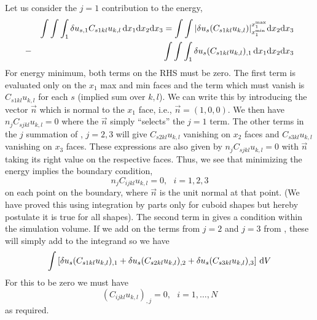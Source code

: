 \documentclass[a4paper]{article}
\begin{document}
Let us consider the $j=1$ contribution to the
energy,
\begin{eqnarray}
 &{}& \int \int \int_1 \delta u_{s,1} C_{s1kl} u_{k,l}\, \mathrm{d} x_1 \mathrm{d} x_2 \mathrm{d} x_3
=\int \int |\delta u_s (C_{s1kl} u_{k,l})|_{x_1^{\mathrm{min}}}^{x_1^{\mathrm{max}}}\mathrm{d} x_2 \mathrm{d} x_3 
\nonumber\\
&-&\int\int\int_1 \delta u_s (C_{s1kl} u_{k,l})_{,1} \,\mathrm{d} x_1 \mathrm{d} x_2 \mathrm{d} x_3
\label{byparts}
\end{eqnarray}
For energy minimum, both terms on the RHS must be zero. The first term
is evaluated only on the $x_1$ max and min faces and the term which
must vanish is $C_{s1kl} u_{k,l}$ for each $s$ (implied sum over
$k,l$). We can write this by introducing the vector $\vec n$ which is
normal to the $x_1$ face, i.e., $\vec n=(1,0,0)$. We then have
$n_j C_{sjkl} u_{k,l}=0$ where the $\vec n$ simply ``selects'' the
$j=1$ term. The other terms in the $j$ summation of , $j=2,3$ will
give $C_{s2kl} u_{k,l}$ vanishing on $x_2$ faces and $C_{s3kl}
u_{k,l}$ vanishing on $x_3$ faces. These expressions are also given by
$n_j C_{sjkl} u_{k,l}=0$ with $\vec n$ taking its right value on the
respective faces. Thus, we see that minimizing the energy implies the
boundary condition,
\begin{equation}
  n_j C_{ijkl} u_{k,l}=0,~~~i=1,2,3
\end{equation}
on each point on the boundary, where $\vec n$ is the unit normal at
that point. (We have proved this using integration by parts only for
cuboid shapes but hereby postulate it is true for all shapes). The second
term in  gives a condition within the simulation volume. If we add
on the terms from $j=2$ and $j=3$ from , these will simply add to the
integrand so we have
\begin{equation}
  \int \left[\delta u_s(C_{s1kl} u_{k,l})_{,1}
+\delta u_s(C_{s2kl} u_{k,l})_{,2}
+\delta u_s(C_{s3kl} u_{k,l})_{,3}\right]\,\mathrm{d} V
\end{equation}
For this to be zero we must have
\begin{equation}
  (C_{ijkl} u_{k,l})_{,j}=0,~~~i=1,\ldots,N
\end{equation}
as required.
\end{document}
